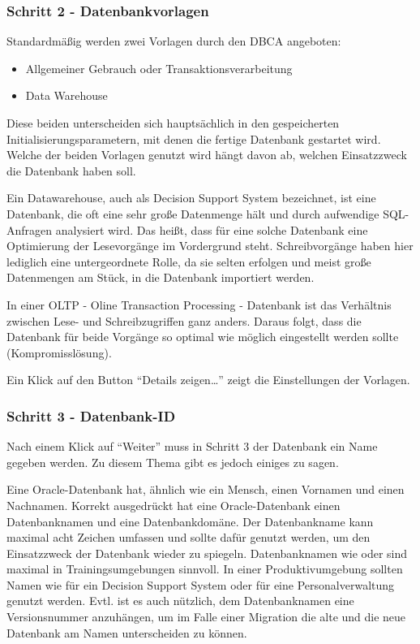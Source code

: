         \subsubsection{Schritt 2 - Datenbankvorlagen}
          Standardmäßig werden zwei Vorlagen durch den DBCA angeboten:
          \begin{itemize}
            \item Allgemeiner Gebrauch oder Transaktionsverarbeitung
            \item Data Warehouse
          \end{itemize}
          Diese beiden unterscheiden sich hauptsächlich in den gespeicherten Initialisierungsparametern, mit denen die fertige Datenbank gestartet wird. Welche der beiden Vorlagen genutzt wird hängt davon ab, welchen Einsatzzweck die Datenbank haben soll.

          Ein Datawarehouse, auch als Decision Support System bezeichnet, ist eine Datenbank, die oft eine sehr große Datenmenge hält und durch aufwendige SQL-Anfragen analysiert wird. Das heißt, dass für eine solche Datenbank eine Optimierung der Lesevorgänge im Vordergrund steht. Schreibvorgänge haben hier lediglich eine untergeordnete Rolle, da sie selten erfolgen und meist große Datenmengen am Stück, in die Datenbank importiert werden.

          In einer OLTP - Oline Transaction Processing - Datenbank ist das Verhältnis zwischen Lese- und Schreibzugriffen ganz anders. Daraus folgt, dass die Datenbank für beide Vorgänge so optimal wie möglich eingestellt werden sollte (Kompromisslösung).

          Ein Klick auf den Button \enquote{Details zeigen\dots} zeigt die Einstellungen der Vorlagen.

        \subsubsection{Schritt 3 - Datenbank-ID}
          Nach einem Klick auf \enquote{Weiter} muss in Schritt 3 der Datenbank ein Name gegeben werden. Zu diesem Thema gibt es jedoch einiges zu sagen.

          Eine Oracle-Datenbank hat, ähnlich wie ein Mensch, einen Vornamen und einen Nachnamen. Korrekt ausgedrückt hat eine Oracle-Datenbank einen Datenbanknamen und eine Datenbankdomäne. Der Datenbankname kann maximal acht Zeichen umfassen und sollte dafür genutzt werden, um den Einsatzzweck der Datenbank wieder zu spiegeln. Datenbanknamen wie  oder  sind maximal in Trainingsumgebungen sinnvoll. In einer Produktivumgebung sollten Namen wie  für ein Decision Support System oder  für eine Personalverwaltung genutzt werden. Evtl. ist es auch nützlich, dem Datenbanknamen eine Versionsnummer anzuhängen, um im Falle einer Migration die alte und die neue Datenbank am Namen unterscheiden zu können.

